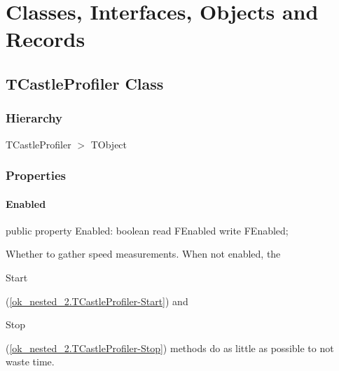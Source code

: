 \documentclass{report}
\begin{document}
\section{Classes, Interfaces, Objects and Records}
\subsection*{TCastleProfiler Class}
\subsubsection*{\large{\textbf{Hierarchy}}\normalsize\hspace{1ex}\hfill}
TCastleProfiler {$>$} TObject
\subsubsection*{\large{\textbf{Properties}}\normalsize\hspace{1ex}\hfill}
\paragraph*{Enabled}\hspace*{\fill}

\begin{list}{}{
\setlength{\itemindent}{0cm}
\setlength{\listparindent}{0cm}
\setlength{\leftmargin}{\evensidemargin}
\addtolength{\leftmargin}{\tmplength}
\settowidth{\labelsep}{X}
\addtolength{\leftmargin}{\labelsep}
\setlength{\labelwidth}{\tmplength}
}
\begin{flushleft}
\item[\textbf{Declaration}\hfill]
\begin{ttfamily}
public property Enabled: boolean read FEnabled write FEnabled;\end{ttfamily}


\end{flushleft}
\par
\item[\textbf{Description}]
Whether to gather speed measurements. When not enabled, the \begin{ttfamily}Start\end{ttfamily}(\ref{ok_nested_2.TCastleProfiler-Start}) and \begin{ttfamily}Stop\end{ttfamily}(\ref{ok_nested_2.TCastleProfiler-Stop}) methods do as little as possible to not waste time.

\end{list}
\end{document}
